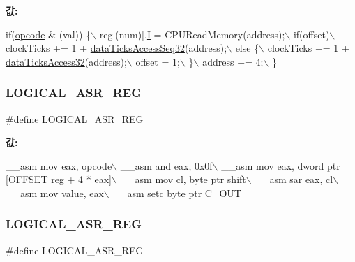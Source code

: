{\bfseries 값\+:}
\begin{DoxyCode}
\textcolor{keywordflow}{if}(\mbox{\hyperlink{arm-new_8h_a4fc220098f4b9d0e039a28274d05c198}{opcode}} & (val)) \{\(\backslash\)
    reg[(num)].\mbox{\hyperlink{arm-new_8h_a782b7c7c9a56a2031f6270eac7f000d6}{I}} = CPUReadMemory(address);\(\backslash\)
    if(offset)\(\backslash\)
      clockTicks += 1 + \mbox{\hyperlink{_g_b_a_8cpp_a7f6f2734b76f7d8031fc2ffc5673aa74}{dataTicksAccessSeq32}}(address);\(\backslash\)
    else \{\(\backslash\)
      clockTicks += 1 + \mbox{\hyperlink{_g_b_a_8cpp_ac863611762e3e5f63cd5babe38b2fcc7}{dataTicksAccess32}}(address);\(\backslash\)
      offset = 1;\(\backslash\)
    \}\(\backslash\)
    address += 4;\(\backslash\)
  \}
\end{DoxyCode}
\mbox{\label{_g_b_a_8cpp_ac1a7b6056b7a092cdb5412c4829c72ae}} 
\subsubsection{\texorpdfstring{L\+O\+G\+I\+C\+A\+L\+\_\+\+A\+S\+R\+\_\+\+R\+EG}{LOGICAL\_ASR\_REG}\hspace{0.1cm}{\footnotesize\ttfamily [1/2]}}
{\footnotesize\ttfamily \#define L\+O\+G\+I\+C\+A\+L\+\_\+\+A\+S\+R\+\_\+\+R\+EG}

{\bfseries 값\+:}
\begin{DoxyCode}
\_\_asm mov eax, opcode\(\backslash\)
        \_\_asm and eax, 0x0f\(\backslash\)
        \_\_asm mov eax, dword ptr [OFFSET \mbox{\hyperlink{_g_b_a_8h_ae29faba89509024ffd1a292badcedf2d}{reg}} + 4 * eax]\(\backslash\)
        \_\_asm mov cl, byte ptr shift\(\backslash\)
        \_\_asm sar eax, cl\(\backslash\)
        \_\_asm mov value, eax\(\backslash\)
        \_\_asm setc byte ptr C\_OUT
\end{DoxyCode}
\mbox{\label{arm-new_8h_ac1a7b6056b7a092cdb5412c4829c72ae}} 
\subsubsection{\texorpdfstring{L\+O\+G\+I\+C\+A\+L\+\_\+\+A\+S\+R\+\_\+\+R\+EG}{LOGICAL\_ASR\_REG}\hspace{0.1cm}{\footnotesize\ttfamily [2/2]}}
{\footnotesize\ttfamily \#define L\+O\+G\+I\+C\+A\+L\+\_\+\+A\+S\+R\+\_\+\+R\+EG}

